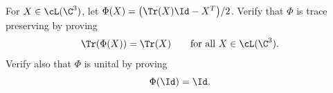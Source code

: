 For $X\in\cL(\C^3)$, let $\Phi(X)=\bigl(\Tr(X)\Id-X^T\bigr)/2$. Verify that $\Phi$ is trace preserving by proving
$$
\Tr(\Phi(X))=\Tr(X)
\qquad\text{for all }X\in\cL(\C^3).
$$
Verify also that $\Phi$ is unital by proving
$$
\Phi(\Id)=\Id.
$$

